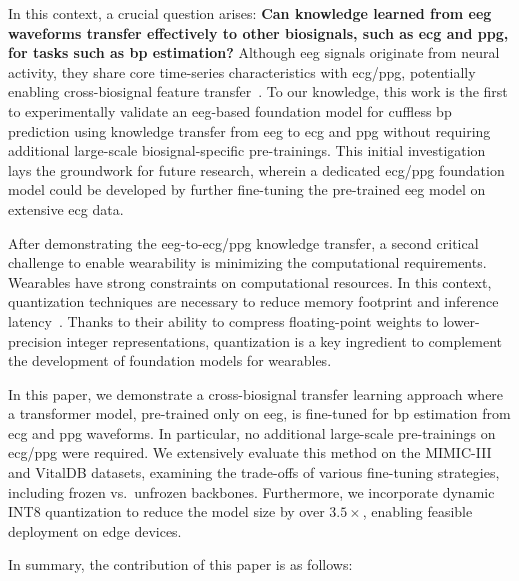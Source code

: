 In this context, a crucial question arises: \textbf{Can knowledge learned from \gls{eeg} waveforms transfer effectively to other biosignals, such as \gls{ecg} and \gls{ppg}, for tasks such as \gls{bp} estimation?} Although \gls{eeg} signals originate from neural activity, they share core time-series characteristics with \gls{ecg}/\gls{ppg}, potentially enabling cross-biosignal feature transfer~\cite{yang2023cross, ingolfsson2024brainfusenet}. To our knowledge, this work is the first to experimentally validate an \gls{eeg}-based foundation model for cuffless \gls{bp} prediction using knowledge transfer from \gls{eeg} to \gls{ecg} and \gls{ppg} without requiring additional large-scale biosignal-specific pre-trainings. This initial investigation lays the groundwork for future research, wherein a dedicated \gls{ecg}/\gls{ppg} foundation model could be developed by further fine-tuning the pre-trained \gls{eeg} model on extensive \gls{ecg} data.

After demonstrating the \gls{eeg}-to-\gls{ecg}/\gls{ppg} knowledge transfer, a second critical challenge to enable wearability is minimizing the computational requirements. Wearables have strong constraints on computational resources. In this context, quantization techniques are necessary to reduce memory footprint and inference latency~\cite{nagel2021whitepaperneuralnetwork}. Thanks to their ability to compress floating-point weights to lower-precision integer representations, quantization is a key ingredient to complement the development of foundation models for wearables.

In this paper, we demonstrate a cross-biosignal transfer learning approach where a transformer model, pre-trained only on \gls{eeg}, is fine-tuned for \gls{bp} estimation from \gls{ecg} and \gls{ppg} waveforms. In particular, no additional large-scale pre-trainings on \gls{ecg}/\gls{ppg} were required. We extensively evaluate this method on the MIMIC-III and VitalDB datasets, examining the trade-offs of various fine-tuning strategies, including frozen vs.\ unfrozen backbones. Furthermore, we incorporate dynamic INT8 quantization to reduce the model size by over $3.5\times$, enabling feasible deployment on edge devices. 

In summary, the contribution of this paper is as follows:

